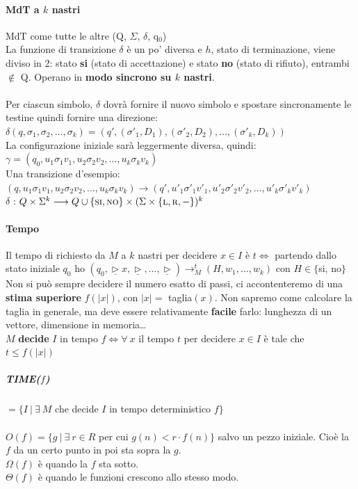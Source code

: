 \documentclass[10pt]{book}
\begin{document}
\paragraph{MdT a $k$ nastri} MdT come tutte le altre (Q, $\Sigma$, $\delta$, q$_0$)\\
La funzione di transizione $\delta$ è un po' diversa e $h$, stato di terminazione, viene diviso in 2: stato \textbf{si} (stato di accettazione) e stato \textbf{no} (stato di rifiuto), entrambi $\not\in$ Q. Operano in \textbf{modo sincrono su $k$ nastri}.\\\\
Per ciascun simbolo, $\delta$ dovrà fornire il nuovo simbolo e spostare sincronamente le testine quindi fornire una direzione: 
$\delta(q, \sigma_1, \sigma_2, \ldots, \sigma_k) = (q', (\sigma'_1, D_1), (\sigma'_2, D_2), \ldots, (\sigma'_k, D_k))$\\
La configurazione iniziale sarà leggermente diversa, quindi: 
$\gamma = (q_0, u_1 \sigma_1 v_1, u_2 \sigma_2 v_2, \ldots, u_k \sigma_k v_k)$\\
Una transizione d'esempio: $(q, u_1\sigma_1 v_1, u_2\sigma_2 v_2, \ldots, u_k \sigma_k v_k) \rightarrow (q', u'_1\sigma'_1 v'_1, u'_2\sigma'_2 v'_2, \ldots, u'_k \sigma'_k v'_k)$\\$\delta$ : $Q\times\Sigma^k \longrightarrow Q\cup\{\textsc{si}, \textsc{no}\}\times(\Sigma\times\{\textsc{l}, \textsc{r}, -\})^k$
\paragraph{Tempo} Il tempo di richiesto da $M$ a $k$ nastri per decidere $x \in I$ è $t \Leftrightarrow$ partendo dallo stato iniziale $q_0$ ho $(q_0, \underline{\triangleright}x, \underline{\triangleright}, \ldots, \underline{\triangleright}) \longrightarrow_M^t (H, w_1, \ldots, w_k)$ con $H \in \{$si, no$\}$\\
Non si può sempre decidere il numero esatto di passi, ci accontenteremo di una \textbf{stima superiore} $f(|x|)$, con $|x| =$ taglia$(x)$. Non sapremo come calcolare la taglia in generale, ma deve essere relativamente \textbf{facile} farlo: lunghezza di un vettore, dimensione in memoria\ldots\\
$M$ \textbf{decide} $I$ in tempo $f \Leftrightarrow \forall\: x$ il tempo $t$ per decidere $x \in I$ è tale che $t \leq f(|x|)$
\subparagraph{TIME($f$)} $= \{I\:|\: \exists\: M$ che decide $I$ in tempo deterministico $f\}$\\\\
$O(f) = \{g\:|\:\exists\: r \in R$ per cui $g(n) < r\cdot f(n)\}$ salvo un pezzo iniziale. Cioè la $f$ da un certo punto in poi sta sopra la $g$.\\$\Omega(f)$ è quando la $f$ sta sotto.\\$\Theta(f)$ è quando le funzioni crescono allo stesso modo.
\end{document}
